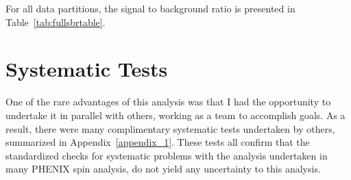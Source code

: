 For all data partitions, the signal to background ratio is presented in
Table~\ref{tab:fullsbrtable}.

\begin{table}
  \centering
  \caption{ 
    A summary table from the results of the EULMF to the unbinned data set,
    summed to one $\eta$ bin per arm and charge.
  }
  \label{tab:fullsbrtable}
\end{table}

\clearpage
\section{Systematic Tests}

One of the rare advantages of this analysis was that I had the opportunity to
undertake it in parallel with others, working as a team to accomplish goals.  As
a result, there were many complimentary systematic tests undertaken by others,
summarized in Appendix~\ref{appendix_1}. These tests all confirm that the
standardized checks for systematic problems with the analysis undertaken in many
PHENIX spin analysis,  do not yield any uncertainty to this analysis.  
